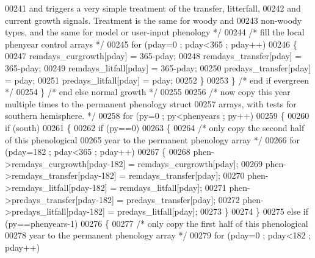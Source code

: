 \begin{DoxyCode}
{{00241 \textcolor{comment}{                and triggers a very simple treatment of the transfer, litterfall,}
00242 \textcolor{comment}{                and current growth signals.  Treatment is the same for woody and}
00243 \textcolor{comment}{                non-woody types, and the same for model or user-input phenology */}
00244                 \textcolor{comment}{/* fill the local phenyear control arrays */}
00245                 \textcolor{keywordflow}{for} (pday=0 ; pday<365 ; pday++)
00246                 \{
00247                     remdays\_curgrowth[pday] = 365-pday;
00248                     remdays\_transfer[pday] = 365-pday;
00249                     remdays\_litfall[pday] = 365-pday;
00250                     predays\_transfer[pday] = pday;
00251                     predays\_litfall[pday] = pday;
00252                 \} 
00253             \} \textcolor{comment}{/* end if evergreen */}
00254         \} \textcolor{comment}{/* end else normal growth */}
00255 
00256         \textcolor{comment}{/* now copy this year multiple times to the permanent phenology struct}
00257 \textcolor{comment}{        arrays, with tests for southern hemisphere. */}
00258         \textcolor{keywordflow}{for} (py=0 ; py<phenyears ; py++)
00259         \{
00260             \textcolor{keywordflow}{if} (south)
00261             \{
00262                 \textcolor{keywordflow}{if} (py==0)
00263                 \{
00264                     \textcolor{comment}{/* only copy the second half of this phenological}
00265 \textcolor{comment}{                    year to the permanent phenology array */}
00266                     \textcolor{keywordflow}{for} (pday=182 ; pday<365 ; pday++)
00267                     \{
00268                         phen->remdays\_curgrowth[pday-182] = remdays\_curgrowth[pday];
00269                         phen->remdays\_transfer[pday-182] = remdays\_transfer[pday];
00270                         phen->remdays\_litfall[pday-182] = remdays\_litfall[pday];
00271                         phen->predays\_transfer[pday-182] = predays\_transfer[pday];
00272                         phen->predays\_litfall[pday-182] = predays\_litfall[pday];
00273                     \}
00274                 \}
00275                 \textcolor{keywordflow}{else} \textcolor{keywordflow}{if} (py==phenyears-1)
00276                 \{
00277                     \textcolor{comment}{/* only copy the first half of this phenological}
00278 \textcolor{comment}{                    year to the permanent phenology array */}
00279                     \textcolor{keywordflow}{for} (pday=0 ; pday<182 ; pday++)
}}
\end{DoxyCode}
